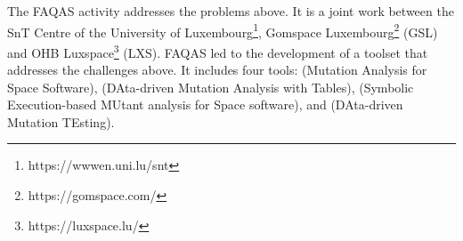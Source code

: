 
The FAQAS activity addresses the problems above. It is a joint work between the SnT Centre of the University of Luxembourg\footnote{https://wwwen.uni.lu/snt}, Gomspace Luxembourg\footnote{https://gomspace.com/} (GSL) and OHB Luxspace\footnote{https://luxspace.lu/} (LXS).
FAQAS led to the development of a toolset that addresses the challenges above. It includes four tools:
 (Mutation Analysis for Space Software),
 (DAta-driven Mutation Analysis with Tables),
 (Symbolic Execution-based MUtant analysis for Space software),
and  (DAta-driven Mutation TEsting).



